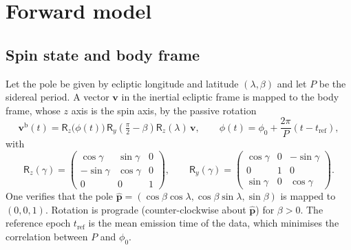 \documentclass[11pt,a4paper]{article}
\theoremstyle{remark}
\newcommand{\vect}[1]{\bm{#1}}
\newcommand{\uv}[1]{\hat{\bm{#1}}}
\begin{document}
\section{Forward model}
\label{sec:model}

\subsection{Spin state and body frame}
Let the pole be given by ecliptic longitude and latitude $(\lambda,\beta)$ and let $P$ be the sidereal
period. A vector $\vect v$ in the inertial ecliptic frame is mapped to the body frame, whose $z$ axis is
the spin axis, by the passive rotation
\begin{equation}
  \vect v^{\mathrm{b}}(t) = \mathsf R_z\bigl(\phi(t)\bigr)\,\mathsf R_y\!\left(\tfrac{\pi}{2}-\beta\right)\mathsf R_z(\lambda)\,\vect v,
  \qquad
  \phi(t)=\phi_0+\frac{2\pi}{P}(t-t_{\mathrm{ref}}),
  \label{eq:rotation}
\end{equation}
with
\begin{equation}
  \mathsf R_z(\gamma)=\begin{pmatrix}\cos\gamma&\sin\gamma&0\\-\sin\gamma&\cos\gamma&0\\0&0&1\end{pmatrix},\qquad
  \mathsf R_y(\gamma)=\begin{pmatrix}\cos\gamma&0&-\sin\gamma\\0&1&0\\ \sin\gamma&0&\cos\gamma\end{pmatrix}.
\end{equation}
One verifies that the pole $\uv p=(\cos\beta\cos\lambda,\cos\beta\sin\lambda,\sin\beta)$ is mapped to
$(0,0,1)$. Rotation is prograde (counter-clockwise about $\uv p$) for $\beta>0$. The reference epoch
$t_{\mathrm{ref}}$ is the mean emission time of the data, which minimises the correlation between $P$
and $\phi_0$.
\end{document}
